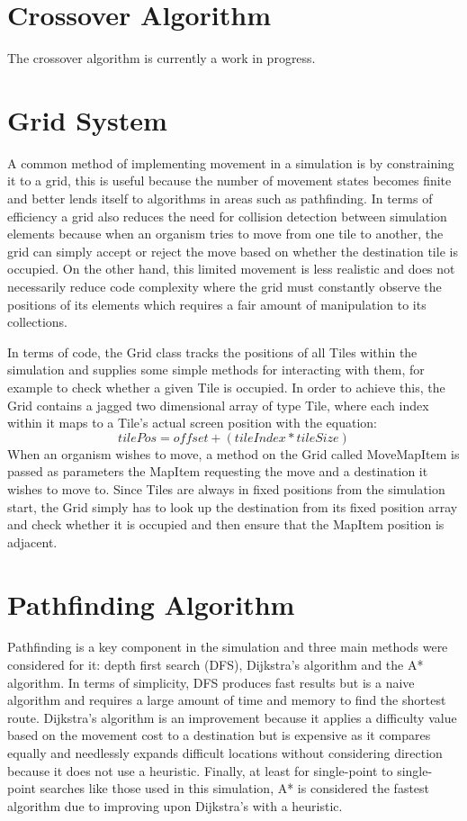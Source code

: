 \documentclass[a4paper, oneside, 11pt]{report}
\begin{document}
\section{Crossover Algorithm}\label{crossover}
The crossover algorithm is currently a work in progress.

\section{Grid System}\label{grid}
A common method of implementing movement in a simulation is by constraining it to a grid, this is useful because the number of movement states becomes finite and better lends itself to algorithms in areas such as pathfinding. In terms of efficiency a grid also reduces the need for collision detection between simulation elements because when an organism tries to move from one tile to another, the grid can simply accept or reject the move based on whether the destination tile is occupied. On the other hand, this limited movement is less realistic and does not necessarily reduce code complexity where the grid must constantly observe the positions of its elements which requires a fair amount of manipulation to its collections. 

In terms of code, the Grid class tracks the positions of all Tiles within the simulation and supplies some simple methods for interacting with them, for example to check whether a given Tile is occupied. In order to achieve this, the Grid contains a jagged two dimensional array of type Tile, where each index within it maps to a Tile's actual screen position with the equation:
\[tilePos = offset + (tileIndex * tileSize)\]
When an organism wishes to move, a method on the Grid called MoveMapItem is passed as parameters the MapItem requesting the move and a destination it wishes to move to. Since Tiles are always in fixed positions from the simulation start, the Grid simply has to look up the destination from its fixed position array and check whether it is occupied and then ensure that the MapItem position is adjacent.

\section{Pathfinding Algorithm}\label{pathfinding}
Pathfinding is a key component in the simulation and three main methods were considered for it: depth first search (DFS), Dijkstra's algorithm and the A* algorithm. In terms of simplicity, DFS produces fast results but is a naive algorithm and requires a large amount of time and memory to find the shortest route. Dijkstra's algorithm is an improvement because it applies a difficulty value based on the movement cost to a destination but is expensive as it compares equally and needlessly expands difficult locations without considering direction because it does not use a heuristic. Finally, at least for single-point to single-point searches like those used in this simulation, A* is considered the fastest algorithm \cite{belwariar} due to improving upon Dijkstra's with a heuristic. 
\end{document}
